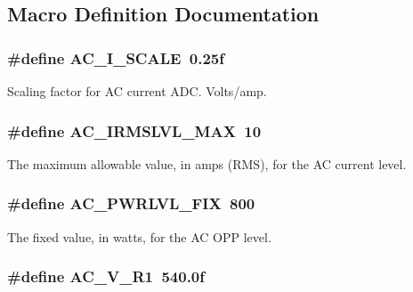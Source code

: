\subsection{Macro Definition Documentation}
\hypertarget{a00043_a4489e85463a26954a958cd3d36732bd3}{
\subsubsection[{A\-C\-\_\-\-I\-\_\-\-S\-C\-A\-L\-E}]{\setlength{\rightskip}{0pt plus 5cm}\#define A\-C\-\_\-\-I\-\_\-\-S\-C\-A\-L\-E~0.\-25f}}\label{a00043_a4489e85463a26954a958cd3d36732bd3}
Scaling factor for A\-C current A\-D\-C. Volts/amp. \hypertarget{a00043_a2b577413184eb560f2f652b11deeba87}{
\subsubsection[{A\-C\-\_\-\-I\-R\-M\-S\-L\-V\-L\-\_\-\-M\-A\-X}]{\setlength{\rightskip}{0pt plus 5cm}\#define A\-C\-\_\-\-I\-R\-M\-S\-L\-V\-L\-\_\-\-M\-A\-X~10}}\label{a00043_a2b577413184eb560f2f652b11deeba87}
The maximum allowable value, in amps (R\-M\-S), for the A\-C current level. \hypertarget{a00043_aa5433ef3bc07259bf870e6e5e115c693}{
\subsubsection[{A\-C\-\_\-\-P\-W\-R\-L\-V\-L\-\_\-\-F\-I\-X}]{\setlength{\rightskip}{0pt plus 5cm}\#define A\-C\-\_\-\-P\-W\-R\-L\-V\-L\-\_\-\-F\-I\-X~800}}\label{a00043_aa5433ef3bc07259bf870e6e5e115c693}
The fixed value, in watts, for the A\-C O\-P\-P level. \hypertarget{a00043_aae95393f182e274eceae9089a10720f7}{
\subsubsection[{A\-C\-\_\-\-V\-\_\-\-R1}]{\setlength{\rightskip}{0pt plus 5cm}\#define A\-C\-\_\-\-V\-\_\-\-R1~540.\-0f}}\label{a00043_aae95393f182e274eceae9089a10720f7}
